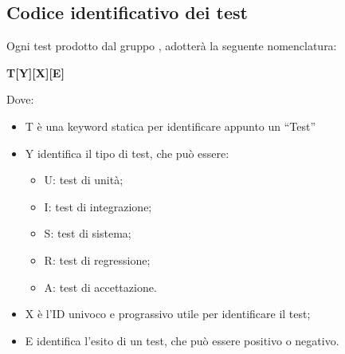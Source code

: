 \subsection{Codice identificativo dei test}
Ogni test prodotto dal gruppo {\Gruppo}, adotterà la seguente nomenclatura:
\begin{center} \textbf{T[Y][X][E]} \end{center}
Dove:
\begin{itemize}
	\item T è una keyword statica per identificare appunto un “Test”
	\item Y identifica il tipo di test, che può essere:
		\begin{itemize}
			\item U: test di unità;
			\item I: test di integrazione;
			\item S: test di sistema;
			\item R: test di regressione;
			\item A: test di accettazione.
		\end{itemize}
		\item X è l'ID univoco e prograssivo utile per identificare il test;
		\item E identifica l'esito di un test, che può essere positivo o negativo.
\end{itemize}
